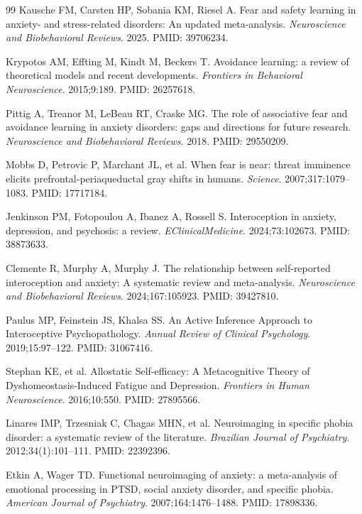 \documentclass[11pt]{article}
\begin{document}
\begin{thebibliography}{99}
Kausche FM, Carsten HP, Sobania KM, Riesel A. Fear and safety learning in anxiety- and stress-related disorders: An updated meta-analysis. \textit{Neuroscience and Biobehavioral Reviews}. 2025. PMID: 39706234.

Krypotos AM, Effting M, Kindt M, Beckers T. Avoidance learning: a review of theoretical models and recent developments. \textit{Frontiers in Behavioral Neuroscience}. 2015;9:189. PMID: 26257618.

Pittig A, Treanor M, LeBeau RT, Craske MG. The role of associative fear and avoidance learning in anxiety disorders: gaps and directions for future research. \textit{Neuroscience and Biobehavioral Reviews}. 2018. PMID: 29550209.

Mobbs D, Petrovic P, Marchant JL, et al. When fear is near: threat imminence elicits prefrontal-periaqueductal gray shifts in humans. \textit{Science}. 2007;317:1079--1083. PMID: 17717184.

Jenkinson PM, Fotopoulou A, Ibanez A, Rossell S. Interoception in anxiety, depression, and psychosis: a review. \textit{EClinicalMedicine}. 2024;73:102673. PMID: 38873633.

Clemente R, Murphy A, Murphy J. The relationship between self-reported interoception and anxiety: A systematic review and meta-analysis. \textit{Neuroscience and Biobehavioral Reviews}. 2024;167:105923. PMID: 39427810.

Paulus MP, Feinstein JS, Khalsa SS. An Active Inference Approach to Interoceptive Psychopathology. \textit{Annual Review of Clinical Psychology}. 2019;15:97--122. PMID: 31067416.

Stephan KE, et al. Allostatic Self-efficacy: A Metacognitive Theory of Dyshomeostasis-Induced Fatigue and Depression. \textit{Frontiers in Human Neuroscience}. 2016;10:550. PMID: 27895566.

Linares IMP, Trzesniak C, Chagas MHN, et al. Neuroimaging in specific phobia disorder: a systematic review of the literature. \textit{Brazilian Journal of Psychiatry}. 2012;34(1):101--111. PMID: 22392396.

Etkin A, Wager TD. Functional neuroimaging of anxiety: a meta-analysis of emotional processing in PTSD, social anxiety disorder, and specific phobia. \textit{American Journal of Psychiatry}. 2007;164:1476--1488. PMID: 17898336.


\end{thebibliography}
\end{document}
